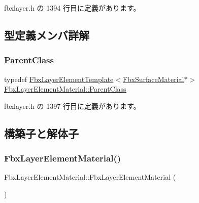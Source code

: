  fbxlayer.\+h の 1394 行目に定義があります。



\subsection{型定義メンバ詳解}
\mbox{\label{class_fbx_layer_element_material_a8f8718ab06cb0f6a9aa82205573fa64b}} 
\subsubsection{\texorpdfstring{Parent\+Class}{ParentClass}}
{\footnotesize\ttfamily typedef \hyperlink{class_fbx_layer_element_template}{Fbx\+Layer\+Element\+Template}$<$\hyperlink{class_fbx_surface_material}{Fbx\+Surface\+Material}$\ast$$>$ \hyperlink{class_fbx_layer_element_material_a8f8718ab06cb0f6a9aa82205573fa64b}{Fbx\+Layer\+Element\+Material\+::\+Parent\+Class}}



 fbxlayer.\+h の 1397 行目に定義があります。



\subsection{構築子と解体子}
\mbox{\label{class_fbx_layer_element_material_ad5f7288e3fc7f3d58853b12390766fe3}} 
\subsubsection{\texorpdfstring{Fbx\+Layer\+Element\+Material()}{FbxLayerElementMaterial()}}
{\footnotesize\ttfamily Fbx\+Layer\+Element\+Material\+::\+Fbx\+Layer\+Element\+Material (\begin{DoxyParamCaption}{ }\end{DoxyParamCaption})\hspace{0.3cm}{\ttfamily [protected]}}


